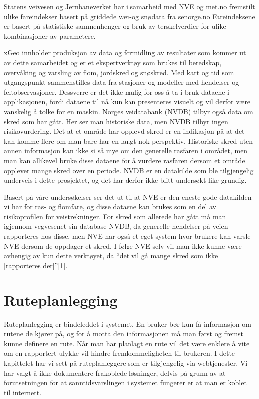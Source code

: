 \documentclass[a4paper,norsk,oneside]{book}
\begin{document}
Statens veivesen og Jernbaneverket har i samarbeid med NVE og met.no fremstilt ulike fareindekser basert på griddede vær-og snødata fra senorge.no
Fareindeksene er basert på statistiske sammenhenger og bruk av terskelverdier for ulike kombinasjoner av parametere. 

xGeo innholder produksjon av data og formidling av resultater som kommer ut av dette samarbeidet og er et ekspertverktøy som brukes til beredskap, overvåking og varsling av flom, jordskred og snøskred.\cite{xgeo} Med kart og tid som utgangspunkt sammenstilles data fra stasjoner og modeller med hendelser og feltobservasjoner. Dessverre er det ikke mulig for oss å ta i bruk dataene i applikasjonen, fordi dataene til nå kun kan presenteres visuelt og vil derfor være vanskelig å tolke for en maskin.
	Norges veidatabank (NVDB) tilbyr også data om skred som har gått. Her ser man historiske data, men NVDB tilbyr ingen risikovurdering. Det at et område har opplevd skred er en indikasjon på at det kan komme flere om man bare har en langt nok perspektiv.  Historiske skred uten annen informasjon kan ikke si så mye om den generelle rasfaren i området, men man kan allikevel bruke disse dataene for å vurdere rasfaren dersom et område opplever mange skred over en periode. NVDB er en datakilde som ble tilgjengelig underveis i dette prosjektet, og det har derfor ikke blitt undersøkt like grundig.

Basert på våre undersøkelser ser det ut til at NVE er den eneste gode datakilden vi har for ras- og flomfare, og disse dataene kan brukes som en del av risikoprofilen for veistrekninger. For skred som allerede har gått må man igjennom vegvesenet sin database NVDB, da generelle hendelser på veien rapporteres hos disse, men NVE har også et eget system hvor brukere kan varsle NVE dersom de oppdager et skred. I følge NVE selv vil man ikke kunne være avhengig av kun dette verktøyet, da “det vil gå mange skred som ikke [rapporteres der]”[1].

\section{Ruteplanlegging}
Ruteplanlegging er bindeleddet i systemet. En bruker bør kun få informasjon om rutene de kjører på, og for å motta den informasjonen må man først og fremst kunne definere en rute. Når man har planlagt en rute vil det være enklere å vite om en rapportert ulykke vil hindre fremkommeligheten til brukeren. I dette kapittelet har vi sett på ruteplanleggere som er tilgjengelig via webtjenester. Vi har valgt å ikke dokumentere frakoblede løsninger, delvis på grunn av at forutsetningen for at sanntidsvarslingen i systemet fungerer er at man er koblet til internett.
\end{document}
